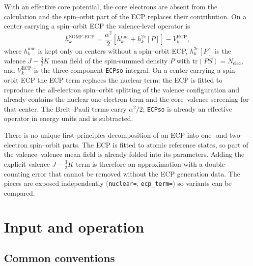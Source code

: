 With an effective core potential, the core electrons are absent from
the calculation and the spin--orbit part of the ECP replaces their
contribution.  On a center carrying a spin--orbit ECP the valence-level
operator is
\begin{equation}
  h^{\mathrm{SOMF\text{-}ECP}}_k
  = \frac{\alpha^{2}}{2}\left[h^{\mathrm{nuc}}_k+h^{2e}_k[P]\right]
    - V^{\mathrm{ECP}}_k,
  \label{eq:x2c-somf-ecp}
\end{equation}
where $h^{\mathrm{nuc}}_k$ is kept only on centers without a
spin--orbit ECP, $h^{2e}_k[P]$ is the valence $J-\tfrac{3}{2}K$ mean
field of the spin-summed density $P$ with
$\mathrm{tr}(PS)=N_{\mathrm{elec}}$, and $V^{\mathrm{ECP}}_k$ is the
three-component \texttt{ECPso} integral.  On a center carrying a
spin--orbit ECP the ECP term replaces the nuclear term: the ECP is
fitted to reproduce the all-electron spin--orbit splitting of the
valence configuration and already contains the nuclear one-electron
term and the core--valence screening for that center.  The
Breit--Pauli terms carry $\alpha^{2}/2$; \texttt{ECPso} is already an
effective operator in energy units and is subtracted.

There is no unique first-principles decomposition of an ECP into one-
and two-electron spin--orbit parts.  The ECP is fitted to atomic
reference states, so part of the valence--valence mean field is already
folded into its parameters.  Adding the explicit valence
$J-\tfrac{3}{2}K$ term is therefore an approximation with a
double-counting error that cannot be removed without the ECP generation
data.  The pieces are exposed independently
(\texttt{nuclear=}, \texttt{ecp\_term=}) so variants can be compared.

\section{Input and operation}
\label{sec:x2c-input}

\subsection{Common conventions}

